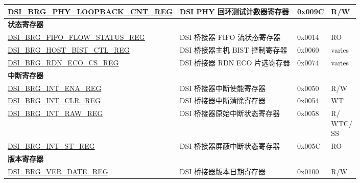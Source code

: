 \begin{longtable}{ | p{6.8cm} | p{6.5cm} | p{1.2cm} | p{1cm} | }
\hyperref[regdesc:DSIBRGPHYLOOPBACKCNTREG]{DSI\_BRG\_PHY\_LOOPBACK\_CNT\_REG} & DSI PHY 回环测试计数器寄存器 & 0x009C & R/W \\ \hline
\multicolumn{4}{|l|}{\textbf{状态寄存器}} \\ \hline
\hyperref[regdesc:DSIBRGFIFOFLOWSTATUSREG]{DSI\_BRG\_FIFO\_FLOW\_STATUS\_REG} & DSI 桥接器 FIFO 流状态寄存器 & 0x0014 & RO \\ \hline
\hyperref[regdesc:DSIBRGHOSTBISTCTLREG]{DSI\_BRG\_HOST\_BIST\_CTL\_REG} & DSI 桥接器主机 BIST 控制寄存器 & 0x0060 & varies \\ \hline
\hyperref[regdesc:DSIBRGRDNECOCSREG]{DSI\_BRG\_RDN\_ECO\_CS\_REG} & DSI 桥接器 RDN ECO 片选寄存器 & 0x0074 & varies \\ \hline
\multicolumn{4}{|l|}{\textbf{中断寄存器}} \\ \hline
\hyperref[regdesc:DSIBRGINTENAREG]{DSI\_BRG\_INT\_ENA\_REG} & DSI 桥接器中断使能寄存器 & 0x0050 & R/W \\ \hline
\hyperref[regdesc:DSIBRGINTCLRREG]{DSI\_BRG\_INT\_CLR\_REG} & DSI 桥接器中断清除寄存器 & 0x0054 & WT \\ \hline
\hyperref[regdesc:DSIBRGINTRAWREG]{DSI\_BRG\_INT\_RAW\_REG} & DSI 桥接器原始中断状态寄存器 & 0x0058 & \makecell[l]{R/\\WTC/\\SS} \\ \hline
\hyperref[regdesc:DSIBRGINTSTREG]{DSI\_BRG\_INT\_ST\_REG} & DSI 桥接器屏蔽中断状态寄存器 & 0x005C & RO \\ \hline
\multicolumn{4}{|l|}{\textbf{版本寄存器}} \\ \hline
\hyperref[regdesc:DSIBRGVERDATEREG]{DSI\_BRG\_VER\_DATE\_REG} & DSI 桥接器版本日期寄存器 & 0x0100 & R/W \\ \hline
\end{longtable}

